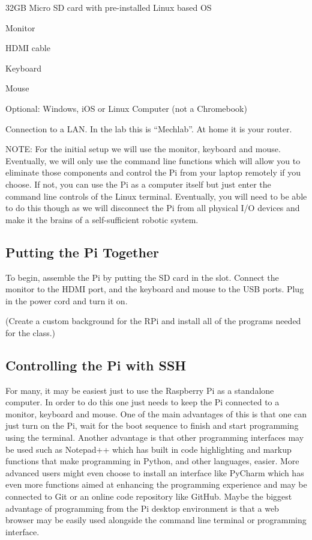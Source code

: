 \documentclass[
]{book}
\begin{document}
32GB Micro SD card with pre-installed Linux based OS

Monitor

HDMI cable

Keyboard

Mouse

Optional: Windows, iOS or Linux Computer (not a Chromebook)

Connection to a LAN. In the lab this is ``Mechlab''. At home it is your router.

NOTE: For the initial setup we will use the monitor, keyboard and mouse. Eventually, we will only use the command line functions which will allow you to eliminate those components and control the Pi from your laptop remotely if you choose. If not, you can use the Pi as a computer itself but just enter the command line controls of the Linux terminal. Eventually, you will need to be able to do this though as we will disconnect the Pi from all physical I/O devices and make it the brains of a self-sufficient robotic system.

\hypertarget{putting-the-pi-together}{%
\subsection{Putting the Pi Together}\label{putting-the-pi-together}}

To begin, assemble the Pi by putting the SD card in the slot. Connect the monitor to the HDMI port, and the keyboard and mouse to the USB ports. Plug in the power cord and turn it on.

(Create a custom background for the RPi and install all of the programs needed for the class.)

\hypertarget{controlling-the-pi-with-ssh}{%
\subsection{Controlling the Pi with SSH}\label{controlling-the-pi-with-ssh}}

For many, it may be easiest just to use the Raspberry Pi as a standalone computer. In order to do this one just needs to keep the Pi connected to a monitor, keyboard and mouse. One of the main advantages of this is that one can just turn on the Pi, wait for the boot sequence to finish and start programming using the terminal. Another advantage is that other programming interfaces may be used such as Notepad++ which has built in code highlighting and markup functions that make programming in Python, and other languages, easier. More advanced users might even choose to install an interface like PyCharm which has even more functions aimed at enhancing the programming experience and may be connected to Git or an online code repository like GitHub. Maybe the biggest advantage of programming from the Pi desktop environment is that a web browser may be easily used alongside the command line terminal or programming interface.
\end{document}
